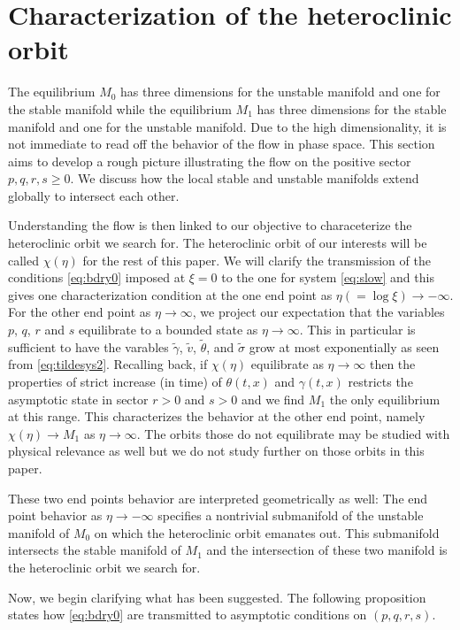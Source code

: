 \documentclass[a4paper,11pt]{article}
\def\tg{{\tilde{\gamma}}}
\def\tv{{\tilde{v}}}
\def\tth{{\tilde{\theta}}}
\def\ts{{\tilde{\sigma}}}
\theoremstyle{remark}
\begin{document}
\section{Characterization of the heteroclinic orbit} \label{sec:char}
The equilibrium $M_0$ has three dimensions for the unstable manifold and one for the stable manifold while the equilibrium $M_1$ has three dimensions for the 
stable manifold and one for the unstable manifold. Due to the high dimensionality, it is not immediate to read off the behavior 
of the flow in phase space. This section aims to develop a rough picture illustrating the flow on the positive sector $p,q,r,s \ge0$. 
We discuss how the local stable and unstable manifolds extend globally to intersect each other. 

Understanding the flow is then linked to our objective to characeterize the heteroclinic orbit we search for. The heteroclinic orbit of our interests will be called $\chi(\eta)$ for the rest of this paper. We will clarify the transmission of the conditions \eqref{eq:bdry0} imposed at $\xi=0$ to the one for system \eqref{eq:slow} and this gives one characterization condition at the one end point as $\eta(=\log\xi) \rightarrow -\infty$. For the other end point as $\eta \rightarrow \infty$, we project our expectation that the variables $p$, $q$, $r$ and $s$ equilibrate to a bounded state as $\eta \rightarrow \infty$. This in particular is sufficient to have the varables $\tg$, $\tv$, $\tth$, and $\ts$ grow at most exponentially as seen from \eqref{eq:tildesys2}. Recalling back, if $\chi(\eta)$ equilibrate as $\eta \rightarrow \infty$ then the properties of strict increase (in time) of  $\theta(t,x)$ and $\gamma(t,x)$ restricts the asymptotic state in sector $r>0$ and $s>0$ and we find $M_1$ the only equilibrium at this range. This characterizes the behavior at the other end point, namely $\chi(\eta) \rightarrow M_1$ as $\eta \rightarrow \infty$. The orbits those do not equilibrate may be studied with physical relevance as well but we do not study further on those orbits in this paper. 

These two end points behavior are interpreted geometrically as well: The end point behavior as $\eta \rightarrow -\infty$ specifies a nontrivial submanifold of the unstable manifold of $M_0$ on which the heteroclinic orbit emanates out. This submanifold intersects the stable manifold of $M_1$ and the intersection of these two manifold is the heteroclinic orbit we search for. 

Now, we begin clarifying what has been suggested. The following proposition states how \eqref{eq:bdry0} are transmitted to asymptotic conditions on $(p,q,r,s)$.
\end{document}
